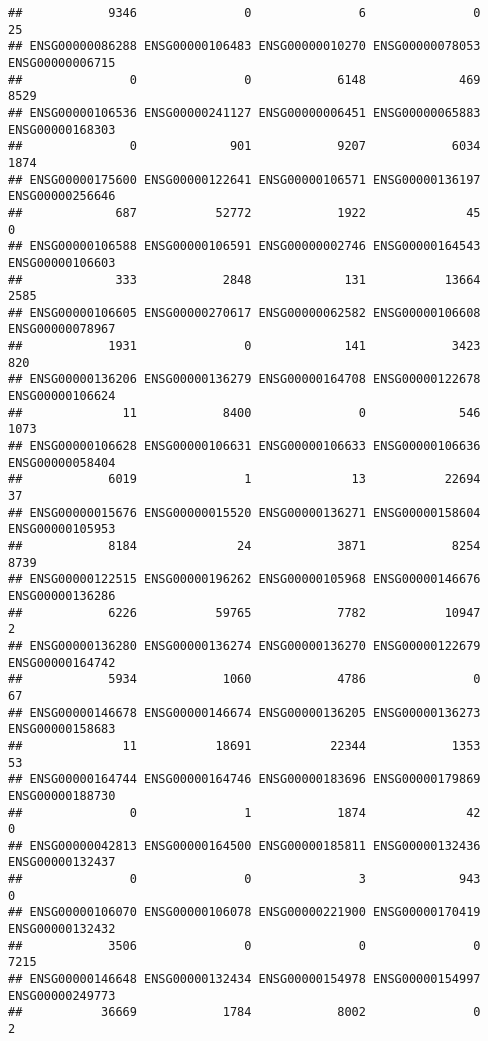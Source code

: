 \documentclass[
]{article}
\begin{document}
\begin{verbatim}
##            9346               0               6               0              25 
## ENSG00000086288 ENSG00000106483 ENSG00000010270 ENSG00000078053 ENSG00000006715 
##               0               0            6148             469            8529 
## ENSG00000106536 ENSG00000241127 ENSG00000006451 ENSG00000065883 ENSG00000168303 
##               0             901            9207            6034            1874 
## ENSG00000175600 ENSG00000122641 ENSG00000106571 ENSG00000136197 ENSG00000256646 
##             687           52772            1922              45               0 
## ENSG00000106588 ENSG00000106591 ENSG00000002746 ENSG00000164543 ENSG00000106603 
##             333            2848             131           13664            2585 
## ENSG00000106605 ENSG00000270617 ENSG00000062582 ENSG00000106608 ENSG00000078967 
##            1931               0             141            3423             820 
## ENSG00000136206 ENSG00000136279 ENSG00000164708 ENSG00000122678 ENSG00000106624 
##              11            8400               0             546            1073 
## ENSG00000106628 ENSG00000106631 ENSG00000106633 ENSG00000106636 ENSG00000058404 
##            6019               1              13           22694              37 
## ENSG00000015676 ENSG00000015520 ENSG00000136271 ENSG00000158604 ENSG00000105953 
##            8184              24            3871            8254            8739 
## ENSG00000122515 ENSG00000196262 ENSG00000105968 ENSG00000146676 ENSG00000136286 
##            6226           59765            7782           10947               2 
## ENSG00000136280 ENSG00000136274 ENSG00000136270 ENSG00000122679 ENSG00000164742 
##            5934            1060            4786               0              67 
## ENSG00000146678 ENSG00000146674 ENSG00000136205 ENSG00000136273 ENSG00000158683 
##              11           18691           22344            1353              53 
## ENSG00000164744 ENSG00000164746 ENSG00000183696 ENSG00000179869 ENSG00000188730 
##               0               1            1874              42               0 
## ENSG00000042813 ENSG00000164500 ENSG00000185811 ENSG00000132436 ENSG00000132437 
##               0               0               3             943               0 
## ENSG00000106070 ENSG00000106078 ENSG00000221900 ENSG00000170419 ENSG00000132432 
##            3506               0               0               0            7215 
## ENSG00000146648 ENSG00000132434 ENSG00000154978 ENSG00000154997 ENSG00000249773 
##           36669            1784            8002               0               2 

\end{verbatim}
\end{document}
